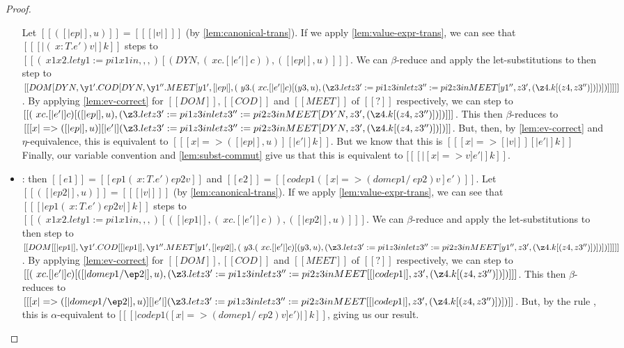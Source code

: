 \documentclass[11pt]{article}
\newcommand{\rrule}[1]{\rref*{#1}}
\begin{document}
\begin{proof}
\begin{itemize}
		Let $[[( [|ep|], u)]] = [[ [|v|] ]]$ (by \autoref{lem:canonical-trans}).
        If we apply \autoref{lem:value-expr-trans}, we can see that $[[ [|(\ x : T . e') v|]k ]]$
        steps to \\$[[ (\ x1  x2. let y1 := pi1 x1 in ,,,)[(DYN, (\ x c . [|e'|]c )), ( [|ep|], u) ]  ]]$.
        We can $\beta$-reduce and apply the let-substitutions to then step to
        \\$[[ DOM [DYN, \y1' . COD [ DYN, \y1''. MEET [y1', [|ep|], (\ y3 . (\ x c . [|e'|]c ) [(y3, u), (\z3 . let z3' := pi1 z3 in let z3'' := pi2 z3 in MEET[y1'', z3', (\z4. k[(z4, z3'')] ) ] ) ] )] ] ] ]]$.
        By applying \autoref{lem:ev-correct} for $[[DOM]], [[COD]]$ and $[[MEET]]$ of $[[?]]$ respectively,
        we can step to  
        \\$[[  (\ x c . [|e'|]c ) [([|ep|], u), (\z3 . let z3' := pi1 z3 in let z3'' := pi2 z3 in MEET[DYN, z3', (\z4. k[(z4, z3'')] ) ] ) ] ]]$.
		This then $\beta$-reduces to 
		\\$[[  [ x |=> ([|ep|], u) ][|e'|](\z3 . let z3' := pi1 z3 in let z3'' := pi2 z3 in MEET[DYN, z3', (\z4. k[(z4, z3'')] ) ] ) ]]$.
		But, then, by \autoref{lem:ev-correct} and $\eta$-equivalence, this is equivalent to
		$[[  [ x |=> ([|ep|], u) ][|e'|]k  ]]$.
		But we know that this is $[[  [ x |=> [|v|] ][|e'|]k  ]]$ 
		Finally, our variable convention and \autoref{lem:subst-commut} give us that 
		this is equivalent to $[[ [| [x |=> v]e' |]k  ]]$.

		\item \rrule{RedAppEv}: then $[[e1]] = [[ ep1 (\ x : T . e') ep2 v ]]$ and $[[e2]]=[[ cod ep1 ([x |=> (dom ep1 /\ ep2) v]e') ]]$.
		Let $[[( [|ep2|], u)]] = [[ [|v|] ]]$ (by \autoref{lem:canonical-trans}).
        If we apply \autoref{lem:value-expr-trans}, we can see that $[[  [|ep1 (\ x : T . e') ep2 v|]k ]]$
        steps to \\$[[ (\ x1  x2. let y1 := pi1 x1 in ,,,)[( [|ep1|] , (\ x c . [|e'|]c )), ( [|ep2|], u) ]  ]]$.
        We can $\beta$-reduce and apply the let-substitutions to then step to
        \\$[[ DOM [ [|ep1|] , \y1' . COD [  [|ep1|] , \y1''. MEET [y1', [|ep2|], (\ y3 . (\ x c . [|e'|]c ) [(y3, u), (\z3 . let z3' := pi1 z3 in let z3'' := pi2 z3 in MEET[y1'', z3', (\z4. k[(z4, z3'')] ) ] ) ] )] ] ] ]]$.
        By applying \autoref{lem:ev-correct} for $[[DOM]], [[COD]]$ and $[[MEET]]$ of $[[?]]$ respectively,
        we can step to  
        \\$[[  (\ x c . [|e'|]c ) [([|dom ep1 /\ep2|], u), (\z3 . let z3' := pi1 z3 in let z3'' := pi2 z3 in MEET[ [|cod ep1|] , z3', (\z4. k[(z4, z3'')] ) ] ) ] ]]$.
		This then $\beta$-reduces to 
		\\$[[  [ x |=> ([|dom ep1 /\ep2|], u) ][|e'|](\z3 . let z3' := pi1 z3 in let z3'' := pi2 z3 in MEET[ [|cod ep1|] , z3', (\z4. k[(z4, z3'')] ) ] ) ]]$.
		But, by the rule \rrule{TransformEv}, this is $\alpha$-equivalent to  $[[ [|cod ep1 ([x |=> (dom ep1 /\ ep2) v]e')|]k ]]$,
		giving us our result.


\end{itemize}
\end{proof}
\end{document}
